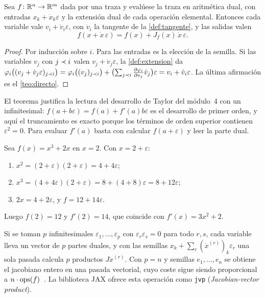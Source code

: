 \begin{teorema}\label{teo:duales}
Sea $f\colon\mathbb{R}^{n}\to\mathbb{R}^{m}$ dada por una traza y evalúese la traza en aritmética dual, con entradas $x_k+\dot x_k\varepsilon$ y la extensión dual de cada operación elemental. Entonces cada variable vale $v_i+\dot v_i\varepsilon$, con $\dot v_i$ la tangente de la \cref{def:tangente}, y las salidas valen
\[
f(x+\dot x\,\varepsilon)=f(x)+J_f(x)\,\dot x\,\varepsilon .
\]
\end{teorema}

\begin{proof}
Por inducción sobre $i$. Para las entradas es la elección de la semilla. Si las variables $v_j$ con $j\prec i$ valen $v_j+\dot v_j\varepsilon$, la \cref{def:extension} da
$\varphi_i\bigl((v_j+\dot v_j\varepsilon)_{j\prec i}\bigr)=\varphi_i\bigl((v_j)_{j\prec i}\bigr)+\bigl(\sum_{j\prec i}\tfrac{\partial\varphi_i}{\partial v_j}\dot v_j\bigr)\varepsilon=v_i+\dot v_i\varepsilon$. La última afirmación es el \cref{teo:directo}.
\end{proof}

El teorema justifica la lectura del desarrollo de Taylor del módulo~4 con un infinitesimal: $f(a+b\varepsilon)=f(a)+f'(a)b\varepsilon$ es el desarrollo de primer orden, y aquí el truncamiento es exacto porque los términos de orden superior contienen $\varepsilon^{2}=0$. Para evaluar $f'(a)$ basta con calcular $f(a+\varepsilon)$ y leer la parte dual.

\begin{ejemplo}\label{ej:dual-cubo}
Sea $f(x)=x^{3}+2x$ en $x=2$. Con $x=2+\varepsilon$:
\begin{enumerate}[label=\arabic*.]
  \item $x^{2}=(2+\varepsilon)(2+\varepsilon)=4+4\varepsilon$;
  \item $x^{3}=(4+4\varepsilon)(2+\varepsilon)=8+(4+8)\varepsilon=8+12\varepsilon$;
  \item $2x=4+2\varepsilon$, y $f=12+14\varepsilon$.
\end{enumerate}
Luego $f(2)=12$ y $f'(2)=14$, que coincide con $f'(x)=3x^{2}+2$.
\end{ejemplo}

\begin{observacion}\label{obs:multidual}
Si se toman $p$ infinitesimales $\varepsilon_1,\dots,\varepsilon_p$ con $\varepsilon_r\varepsilon_s=0$ para todo $r,s$, cada variable lleva un vector de $p$ partes duales, y con las semillas $x_k+\sum_r(\dot x^{(r)})_k\varepsilon_r$ una sola pasada calcula $p$ productos $J\dot x^{(r)}$. Con $p=n$ y semillas $e_1,\dots,e_n$ se obtiene el jacobiano entero en una pasada vectorial, cuyo coste sigue siendo proporcional a $n\cdot\operatorname{ops}(f)$~\cite{mit18337}. La biblioteca JAX ofrece esta operación como \texttt{jvp} (\emph{Jacobian-vector product}).
\end{observacion}


